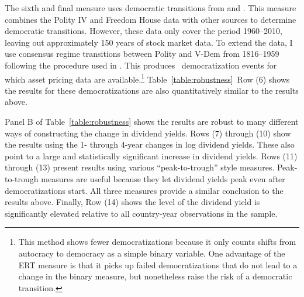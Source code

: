 The sixth and final measure uses democratic transitions from \cite{Papaioannou2008} and \cite{Acemoglu2019}. This measure combines the Polity IV and Freedom House data with other sources to determine democratic transitions. However, these data only cover the period 1960--2010, leaving out approximately 150 years of stock market data. To extend the data, I use consensus regime transitions between Polity and V-Dem from 1816--1959 following the procedure used in \citeauthor{Acemoglu2019}.  This produces \tabBThreeAceDem\ democratization events for which asset pricing data are available.\footnote{This method shows fewer democratizations because it only counts shifts from autocracy to democracy as a simple binary variable. One advantage of the ERT measure is that it picks up failed democratizations that do not lead to a change in the binary measure, but nonetheless raise the risk of a democratic transition.} Table~\ref{table:robustness}~Row (6) shows the results for these democratizations are also quantitatively similar to the results above.

Panel B of Table~\ref{table:robustness} shows the results are robust to many different ways of constructing the change in dividend yields.  Rows (7) through (10) show the results using the 1- through 4-year changes in log dividend yields. These also point to a large and statistically significant increase in dividend yields. Rows (11) through (13) present results using various ``peak-to-trough'' style measures. Peak-to-trough measures are useful because they let dividend yields peak even after democratizations start. All three measures provide a similar conclusion to the results above.  Finally, Row (14) shows the level of the dividend yield is significantly elevated relative to all country-year observations in the sample.


